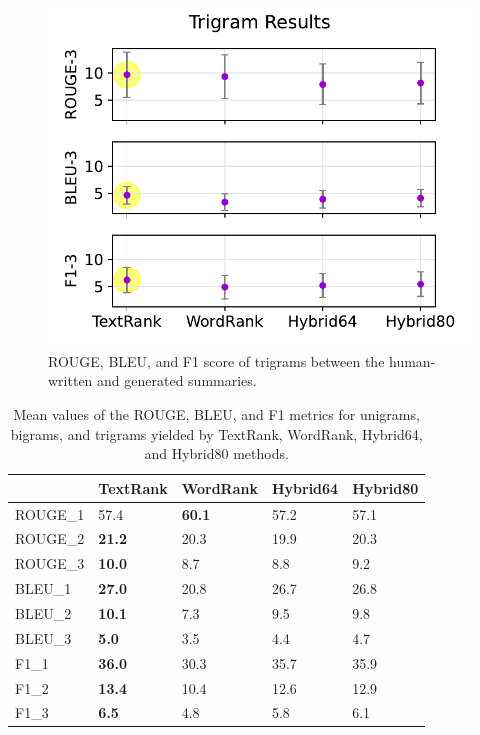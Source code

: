 \documentclass[11pt]{article}
\begin{document}
\begin{figure}[!h]
\centering
\includegraphics[scale = 0.5]{../figures/trigrams.pdf}
\caption{ROUGE, BLEU, and F1 score of trigrams between the human-written and generated summaries.\label{fig:tri}}
\end{figure}

\begin{table}[!h]
\centering
\begin{tabular}{l|llll}
\hline
&\textbf{TextRank} & \textbf{WordRank} & \textbf{Hybrid64} & \textbf{Hybrid80} \\
\hline
ROUGE\_1 & 57.4 & \textbf{60.1} & 57.2 & 57.1\\
ROUGE\_2 & \textbf{21.2} & 20.3 & 19.9 & 20.3\\
ROUGE\_3 & \textbf{10.0} & 8.7 & 8.8 & 9.2\\
BLEU\_1 & \textbf{27.0} & 20.8 & 26.7 & 26.8\\
BLEU\_2 & \textbf{10.1} & 7.3 & 9.5 & 9.8\\
BLEU\_3 & \textbf{5.0} & 3.5 & 4.4 & 4.7\\
F1\_1 & \textbf{36.0} & 30.3 & 35.7 & 35.9\\
F1\_2 & \textbf{13.4} & 10.4 & 12.6 & 12.9\\
F1\_3  & \textbf{6.5} & 4.8 & 5.8 & 6.1\\
\hline
\end{tabular}

\caption{\label{tab:means}
Mean values of the ROUGE, BLEU, and F1 metrics for unigrams, bigrams, and trigrams yielded by TextRank, WordRank, Hybrid64, and Hybrid80 methods.
}
\end{table}
\end{document}
